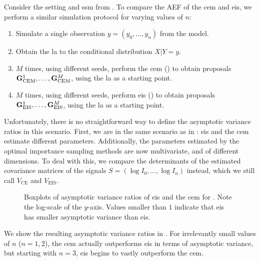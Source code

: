 \begin{example}
    \label{ex:growth_factor_ssm_are}
    Consider the setting and \gls{ssm} from .  To compare the AEF of the \gls{cem} and \gls{eis}, we perform a similar simulation protocol for varying values of $n$:
    \begin{enumerate}
        \item Simulate a single observation $y=(y_{0}, \dots, y_{n})$ from the model.
        \item Obtain the \gls{la} to the conditional distribution $X|Y = y$.
        \item $M$ times, using different seeds, perform the \gls{cem} () to obtain proposals $\mathbf G^{1}_{\text{CEM}}, \dots, \mathbf G^{M}_{\text{CEM}}$, using the \gls{la} as a starting point.
        \item $M$ times, using different seeds, perform \gls{eis} () to obtain proposals $\mathbf G^{1}_{\text{EIS}}, \dots, \mathbf G^{M}_{\text{EIS}}$, using the \gls{la} as a starting point. 
    \end{enumerate}
    
    Unfortunately, there is no straightforward way to define the asymptotic variance ratios in this scenario. First, we are in the same scenario as in : \gls{eis} and the \gls{cem} estimate different parameters. Additionally, the parameters estimated by the optimal importance sampling methods are now multivariate, and of different dimensions. 
    To deal with this, we compare the determinants of the estimated covariance matrices of the signals $S = \left( \log I_{0}, \dots, \log I_{n} \right)$ instead, which we still call $V_{\text{CE}}$ and $V_{\text{EIS}}$.

    

    \begin{figure}
        \centering

        \resizebox{\textwidth}{!}{%
        }
        \caption{Boxplots of asymptotic variance ratios of \gls{eis} and the \gls{cem} for . Note the log-scale of the $y$-axis. Values smaller than $1$ indicate that \gls{eis} has smaller asymptotic variance than \gls{eis}.}
        \label{fig:ssm_comparison_asymptotic_variance}
    \end{figure}

    We show the resulting asymptotic variance ratios in . For irrelevantly small values of $n$ ($n=1,2$), the \gls{cem} actually outperforms \gls{eis} in terms of asymptotic variance, but starting with $n = 3$, \gls{eis} begins to vastly outperform the \gls{cem}. 
\end{example}
